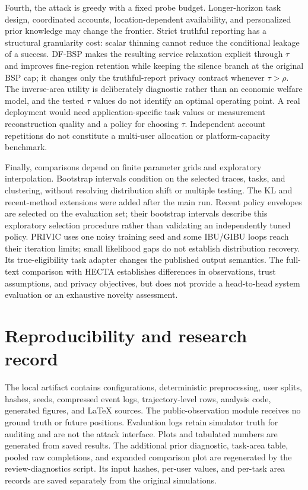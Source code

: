 \documentclass[review,11pt,times]{elsarticle}
\begin{document}
Fourth, the attack is greedy with a fixed probe budget. Longer-horizon task design, coordinated accounts, location-dependent availability, and personalized prior knowledge may change the frontier. Strict truthful reporting has a structural granularity cost: scalar thinning cannot reduce the conditional leakage of a success. DF-BSP makes the resulting service relaxation explicit through $\tau$ and improves fine-region retention while keeping the silence branch at the original BSP cap; it changes only the truthful-report privacy contract whenever $\tau>\rho$. The inverse-area utility is deliberately diagnostic rather than an economic welfare model, and the tested $\tau$ values do not identify an optimal operating point. A real deployment would need application-specific task values or measurement reconstruction quality and a policy for choosing $\tau$. Independent account repetitions do not constitute a multi-user allocation or platform-capacity benchmark.

Finally, comparisons depend on finite parameter grids and exploratory interpolation. Bootstrap intervals condition on the selected traces, tasks, and clustering, without resolving distribution shift or multiple testing. The KL and recent-method extensions were added after the main run. Recent policy envelopes are selected on the evaluation set; their bootstrap intervals describe this exploratory selection procedure rather than validating an independently tuned policy. PRIVIC uses one noisy training seed and some IBU/GIBU loops reach their iteration limits; small likelihood gaps do not establish distribution recovery. Its true-eligibility task adapter changes the published output semantics. The full-text comparison with HECTA establishes differences in observations, trust assumptions, and privacy objectives, but does not provide a head-to-head system evaluation or an exhaustive novelty assessment.

\section{Reproducibility and research record}
The local artifact contains configurations, deterministic preprocessing, user splits, hashes, seeds, compressed event logs, trajectory-level rows, analysis code, generated figures, and LaTeX sources. The public-observation module receives no ground truth or future positions. Evaluation logs retain simulator truth for auditing and are not the attack interface. Plots and tabulated numbers are generated from saved results. The additional prior diagnostic, task-area table, pooled raw completions, and expanded comparison plot are regenerated by the review-diagnostics script. Its input hashes, per-user values, and per-task area records are saved separately from the original simulations.
\end{document}
